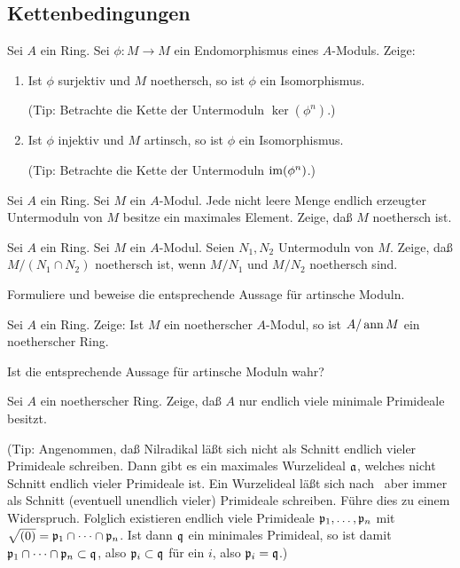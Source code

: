 \subsection{Kettenbedingungen}

\begin{exercise}
	Sei \(A\) ein Ring. Sei \(\phi\colon M \to M\) ein Endomorphismus eines \(A\)-Moduls.
	Zeige:
	\begin{enumerate}
	\item
		Ist \(\phi\) surjektiv und \(M\) noethersch, so ist \(\phi\) ein Isomorphismus.
		
		(Tip: Betrachte die Kette der Untermoduln \(\ker(\phi^n)\).)
	\item
		Ist \(\phi\) injektiv und \(M\) artinsch, so ist \(\phi\) ein Isomorphismus.
		
		(Tip: Betrachte die Kette der Untermoduln \(\operatorname{im}(\phi^n)\).)
	\end{enumerate}
\end{exercise}

\begin{exercise}
	Sei \(A\) ein Ring. Sei \(M\) ein \(A\)-Modul. Jede nicht leere Menge endlich erzeugter
	Untermoduln von \(M\) besitze ein maximales Element. Zeige, daß \(M\) noethersch ist.
\end{exercise}

\begin{exercise}
	Sei \(A\) ein Ring. Sei \(M\) ein \(A\)-Modul. Seien \(N_1, N_2\) Untermoduln von \(M\).
	Zeige, daß \(M/(N_1 \cap N_2)\) noethersch ist, wenn \(M/N_1\) und \(M/N_2\) noethersch
	sind.
	
	Formuliere und beweise die entsprechende Aussage für artinsche Moduln.
\end{exercise}

\begin{exercise}
	Sei \(A\) ein Ring. Zeige: Ist \(M\) ein noetherscher \(A\)-Modul, so ist \(A/\operatorname{ann} M\)
	ein noetherscher Ring.
	
	Ist die entsprechende Aussage für artinsche Moduln wahr?
\end{exercise}

\begin{exercise}
	Sei \(A\) ein noetherscher Ring. Zeige, daß \(A\) nur endlich viele minimale Primideale
	besitzt.
	
	(Tip: Angenommen, daß Nilradikal läßt sich nicht als Schnitt endlich vieler Primideale schreiben.
	Dann gibt es ein maximales Wurzelideal \(\mathfrak{a}\), welches nicht Schnitt endlich vieler Primideale ist.
	Ein Wurzelideal läßt sich nach~ aber immer als Schnitt (eventuell unendlich vieler) Primideale 
	schreiben. Führe dies zu einem Widerspruch. Folglich existieren endlich viele Primideale \(\mathfrak{p}_1, \dotsc,
	\mathfrak{p}_n\) mit \(\sqrt{(0)} = \mathfrak{p}_1 \cap \dotsb \cap \mathfrak{p}_n\). Ist dann \(\mathfrak{q}\) ein minimales Primideal, so 
	ist damit \(\mathfrak{p}_1 \cap \dotsb \cap \mathfrak{p}_n \subset \mathfrak{q}\), also \(\mathfrak{p}_i \subset \mathfrak{q}\) für
	ein \(i\), also \(\mathfrak{p}_i = \mathfrak{q}\).)
\end{exercise}

